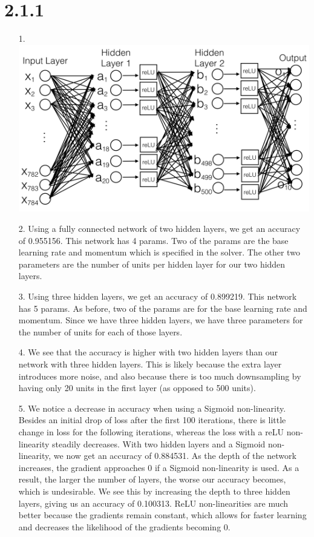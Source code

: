 \documentclass[11pt]{article}
\begin{document}
\section*{2.1.1}
\begin{itemize}
\item[1.] \includegraphics[scale=0.5]{diagrams/nnschematic.png}\\
\item[2.] Using a fully connected network of two hidden layers, we get an accuracy of 0.955156. This network has 4 params. Two of the params are the base learning rate and momentum which is specified in the solver. The other two parameters are the number of units per hidden layer for our two hidden layers. 
\item[3.] Using three hidden layers, we get an accuracy of 0.899219. This network has 5 params. As before, two of the params are for the base learning rate and momentum. Since we have three hidden layers, we have three parameters for the number of units for each of those layers.
\item[4.] We see that the accuracy is higher with two hidden layers than our network with three hidden layers. This is likely because the extra layer introduces more noise, and also because there is too much downsampling by having only 20 units in the first layer (as opposed to 500 units). 
\item[5.] We notice a decrease in accuracy when using a Sigmoid non-linearity. Besides an initial drop of loss after the first 100 iterations, there is little change in loss for the following iterations, whereas the loss with a reLU non-linearity steadily decreases. With two hidden layers and a Sigmoid non-linearity, we now get an accuracy of 0.884531. As the depth of the network increases, the gradient approaches 0 if a Sigmoid non-linearity is used. As a result, the larger the number of layers, the worse our accuracy becomes, which is undesirable. We see this by increasing the depth to three hidden layers, giving us an accuracy of 0.100313. ReLU non-linearities are much better because the gradients remain constant, which allows for faster learning and decreases the likelihood of the gradients becoming 0.

\end{itemize}
\newpage
\end{document}
